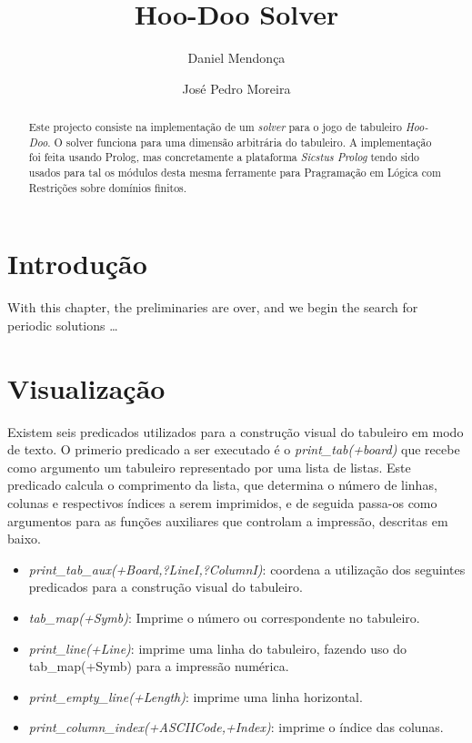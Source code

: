 \documentclass{llncs}
\begin{document}
\title{Hoo-Doo Solver}

\author{Daniel Mendonça \and Jos\'{e} Pedro Moreira}


\maketitle
%
\begin{abstract}
Este projecto consiste na implementação de um \textit{solver} para o jogo de tabuleiro \textit{Hoo-Doo}. O solver funciona para uma dimensão arbitrária do tabuleiro. A implementação foi feita usando Prolog, mas concretamente a plataforma \emph{Sicstus Prolog}  tendo sido usados para tal os módulos desta mesma ferramente para Pragramação em Lógica com Restrições sobre domínios finitos.
\end{abstract}
%
\section{Introdu\c{c}\~{a}o}
%
With this chapter, the preliminaries are over, and we begin the
search for periodic solutions \dots
%
\section{Visualiza\c{c}\~{a}o}
%
Existem seis predicados utilizados para a construção visual do tabuleiro em modo de texto. O primerio predicado a ser executado é o \textit{print\_tab(+board)} que recebe como argumento um tabuleiro representado por uma lista de listas. Este predicado calcula o comprimento da lista, que determina o número de linhas, colunas e respectivos índices a serem imprimidos, e de seguida passa-os como argumentos  para as funções auxiliares que controlam a impressão, descritas em baixo.

\begin{itemize}
\item \textit{print\_tab\_aux(+Board,?LineI,?ColumnI)}: coordena a utilização dos seguintes predicados para a construção visual do tabuleiro.
\item \textit{tab\_map(+Symb)}: Imprime o número ou correspondente no tabuleiro.
\item \textit{print\_line(+Line)}: imprime uma linha do tabuleiro, fazendo uso do tab\_map(+Symb) para a impressão numérica.
\item \textit{print\_empty\_line(+Length)}: imprime uma linha horizontal.
\item \textit{print\_column\_index(+ASCIICode,+Index)}: imprime o índice das colunas.
\end{itemize}
\end{document}
